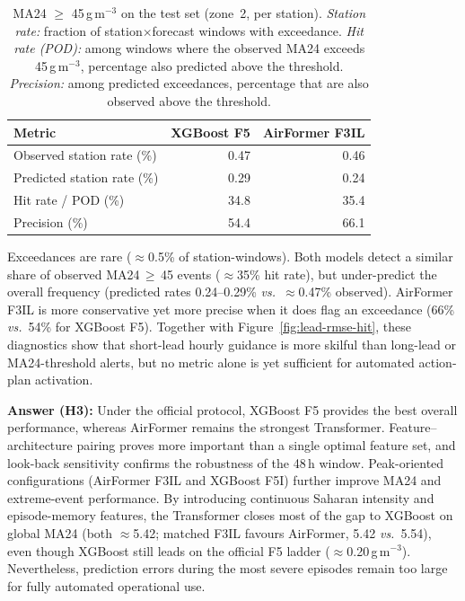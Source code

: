 \documentclass[11pt]{article}
\newcommand{\revnew}[1]{\textcolor{orange!75!black}{#1}}
\begin{document}
\revnew{%
\begin{table}[H]
\centering
\caption{MA24 $\geq$ 45\,\textmu g\,m$^{-3}$ on the test set (zone~2, per station). \emph{Station rate:} fraction of station$\times$forecast windows with exceedance. \emph{Hit rate (POD):} among windows where the observed MA24 exceeds 45\,\textmu g\,m$^{-3}$, percentage also predicted above the threshold. \emph{Precision:} among predicted exceedances, percentage that are also observed above the threshold.}
\label{tab:ma24-45}
\small
\begin{tabular}{@{}lrr@{}}
\toprule
Metric & XGBoost F5 & AirFormer F3IL \\
\midrule
Observed station rate (\%) & 0.47 & 0.46 \\
Predicted station rate (\%) & 0.29 & 0.24 \\
Hit rate / POD (\%) & 34.8 & 35.4 \\
Precision (\%) & 54.4 & 66.1 \\
\bottomrule
\end{tabular}
\end{table}
}

\revnew{Exceedances are rare ($\approx$0.5\% of station-windows). Both models detect a similar share of observed MA24\,$\geq$\,45 events ($\approx$35\% hit rate), but under-predict the overall frequency (predicted rates 0.24--0.29\% \emph{vs.}\ $\approx$0.47\% observed). AirFormer F3IL is more conservative yet more precise when it does flag an exceedance (66\% \emph{vs.}\ 54\% for XGBoost F5). Together with Figure~\ref{fig:lead-rmse-hit}, these diagnostics show that short-lead hourly guidance is more skilful than long-lead or MA24-threshold alerts, but no metric alone is yet sufficient for automated action-plan activation.}

\textbf{Answer (H3):} Under the official protocol, XGBoost F5 provides the best overall performance, whereas AirFormer remains the strongest Transformer. Feature--architecture pairing proves more important than a single optimal feature set, and look-back sensitivity confirms the robustness of the 48\,h window. Peak-oriented configurations (AirFormer F3IL and XGBoost F5I) further improve MA24 and extreme-event performance. \revnew{By introducing continuous Saharan intensity and episode-memory features, the Transformer closes most of the gap to XGBoost on global MA24 (both $\approx$5.42; matched F3IL favours AirFormer, 5.42 \emph{vs.}\ 5.54), even though XGBoost still leads on the official F5 ladder ($\approx$0.20\,\textmu g\,m$^{-3}$).} Nevertheless, prediction errors during the most severe episodes remain too large for fully automated operational use.
\end{document}
